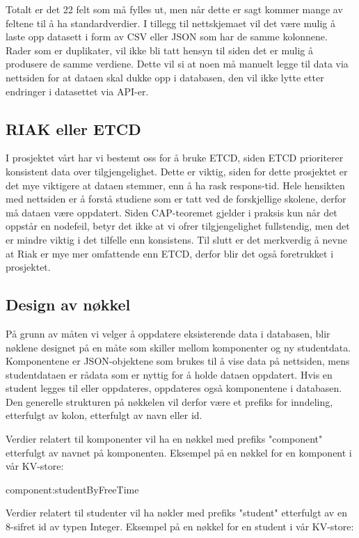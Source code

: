 Totalt er det 22 felt som må fylles ut, men når dette er sagt kommer mange av feltene til å ha standardverdier. I tillegg til nettskjemaet vil det være mulig å laste opp datasett i form av CSV eller JSON som har de samme kolonnene. Rader som er duplikater, vil ikke bli tatt hensyn til siden det er mulig å produsere de samme verdiene. Dette vil si at noen må manuelt legge til data via nettsiden for at dataen skal dukke opp i databasen, den vil ikke lytte etter endringer i datasettet via API-er.

\subsection{RIAK eller ETCD}
I prosjektet vårt har vi bestemt oss for å bruke ETCD, siden ETCD prioriterer konsistent data over tilgjengelighet. Dette er viktig, siden for dette prosjektet er det mye viktigere at dataen stemmer, enn å ha rask respons-tid. Hele hensikten med nettsiden er å forstå studiene som er tatt ved de forskjellige skolene, derfor må dataen være oppdatert. Siden CAP-teoremet gjelder i praksis kun når det oppstår en nodefeil, betyr det ikke at vi ofrer tilgjengelighet fullstendig, men det er mindre viktig i det tilfelle enn konsistens. Til slutt er det merkverdig å nevne at Riak er mye mer omfattende enn ETCD, derfor blir det også foretrukket i prosjektet.

\subsection{Design av nøkkel}
På grunn av måten vi velger å oppdatere eksisterende data i databasen, blir nøklene designet på en måte som skiller mellom komponenter og ny studentdata. Komponentene er JSON-objektene som brukes til å vise data på nettsiden, mens studentdataen er rådata som er nyttig for å holde dataen oppdatert. Hvis en student legges til eller oppdateres, oppdateres også komponentene i databasen. Den generelle strukturen på nøkkelen vil derfor være et prefiks for inndeling, etterfulgt av kolon, etterfulgt av navn eller id.

Verdier relatert til komponenter vil ha en nøkkel med prefiks "component" etterfulgt av navnet på komponenten. Eksempel på en nøkkel for en komponent i vår KV-store:

  component:studentByFreeTime

Verdier relatert til studenter vil ha nøkler med prefiks "student" etterfulgt av en 8-sifret id av typen Integer. Eksempel på en nøkkel for en student i vår KV-store:

